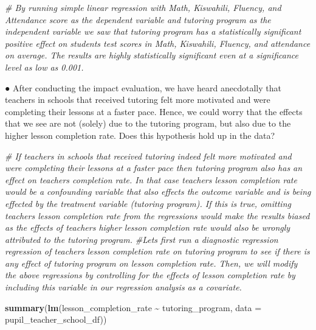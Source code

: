 \documentclass[
]{article}
\newenvironment{Shaded}{\begin{snugshade}}{\end{snugshade}}
\newcommand{\AttributeTok}[1]{\textcolor[rgb]{0.13,0.29,0.53}{#1}}
\newcommand{\CommentTok}[1]{\textcolor[rgb]{0.56,0.35,0.01}{\textit{#1}}}
\newcommand{\FunctionTok}[1]{\textcolor[rgb]{0.13,0.29,0.53}{\textbf{#1}}}
\newcommand{\NormalTok}[1]{#1}
\newcommand{\SpecialCharTok}[1]{\textcolor[rgb]{0.81,0.36,0.00}{\textbf{#1}}}
\begin{document}
\begin{Shaded}
\begin{Highlighting}[]
\CommentTok{\# By running simple linear regression with Math, Kiswahili, Fluency, and Attendance score as the dependent variable and tutoring program as the independent variable we saw that tutoring program has a statistically significant positive effect on students\textquotesingle{} test scores in Math, Kiswahili, Fluency, and attendance on average. The results are highly statistically significant even at a significance level as low as 0.001.}
\end{Highlighting}
\end{Shaded}

● After conducting the impact evaluation, we have heard anecdotally that
teachers in schools that received tutoring felt more motivated and were
completing their lessons at a faster pace. Hence, we could worry that
the effects that we see are not (solely) due to the tutoring program,
but also due to the higher lesson completion rate. Does this hypothesis
hold up in the data?

\begin{Shaded}
\begin{Highlighting}[]
\CommentTok{\# If teachers in schools that received tutoring indeed felt more motivated and were completing their lessons at a faster pace then tutoring program also has an effect on teachers completion rate. In that case teacher\textquotesingle{}s lesson completion rate would be a confounding variable that also effects the outcome variable and is being effected by the treatment variable (tutoring program). If this is true, omitting teachers lesson completion rate from the regressions would make the results biased as the effects of teachers\textquotesingle{} higher lesson completion rate would also be wrongly attributed to the tutoring program.}
\CommentTok{\#Let\textquotesingle{}s first run a diagnostic regression regression of teachers lesson completion rate on tutoring program to see if there is any effect of tutoring program on lesson completion rate. Then, we will modify the above regressions by controlling for the effects of lesson completion rate by including this variable in our regression analysis as a covariate.}
\end{Highlighting}
\end{Shaded}

\begin{Shaded}
\begin{Highlighting}[]
\FunctionTok{summary}\NormalTok{(}\FunctionTok{lm}\NormalTok{(lesson\_completion\_rate }\SpecialCharTok{\textasciitilde{}}\NormalTok{ tutoring\_program, }\AttributeTok{data =}\NormalTok{ pupil\_teacher\_school\_df))}
\end{Highlighting}
\end{Shaded}
\end{document}
